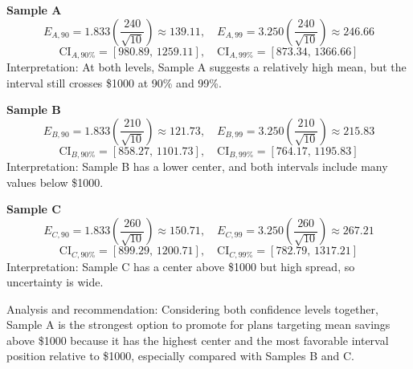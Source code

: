 \textbf{Sample A}
\[
E_{A,90}=1.833\left(\frac{240}{\sqrt{10}}\right)\approx 139.11,
\quad
E_{A,99}=3.250\left(\frac{240}{\sqrt{10}}\right)\approx 246.66
\]
\[
\text{CI}_{A,90\%}=[980.89,\,1259.11],
\quad
\text{CI}_{A,99\%}=[873.34,\,1366.66]
\]
Interpretation: At both levels, Sample A suggests a relatively high mean, but the interval still crosses \$1000 at 90\% and 99\%.

\textbf{Sample B}
\[
E_{B,90}=1.833\left(\frac{210}{\sqrt{10}}\right)\approx 121.73,
\quad
E_{B,99}=3.250\left(\frac{210}{\sqrt{10}}\right)\approx 215.83
\]
\[
\text{CI}_{B,90\%}=[858.27,\,1101.73],
\quad
\text{CI}_{B,99\%}=[764.17,\,1195.83]
\]
Interpretation: Sample B has a lower center, and both intervals include many values below \$1000.

\textbf{Sample C}
\[
E_{C,90}=1.833\left(\frac{260}{\sqrt{10}}\right)\approx 150.71,
\quad
E_{C,99}=3.250\left(\frac{260}{\sqrt{10}}\right)\approx 267.21
\]
\[
\text{CI}_{C,90\%}=[899.29,\,1200.71],
\quad
\text{CI}_{C,99\%}=[782.79,\,1317.21]
\]
Interpretation: Sample C has a center above \$1000 but high spread, so uncertainty is wide.

Analysis and recommendation: Considering both confidence levels together, Sample A is the strongest option to promote for plans targeting mean savings above \$1000 because it has the highest center and the most favorable interval position relative to \$1000, especially compared with Samples B and C.


